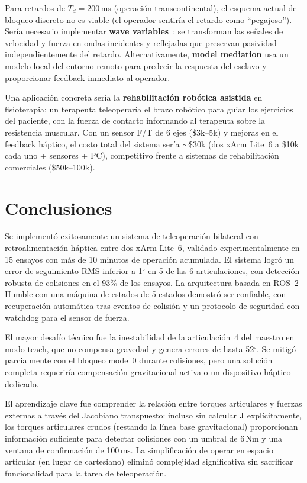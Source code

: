 \documentclass[journal,10pt,twoside]{IEEEtran}
\begin{document}
Para retardos de $T_d=200$\,ms (operación
transcontinental), el esquema actual de bloqueo discreto no es viable
(el operador sentiría el retardo como ``pegajoso''). Sería necesario
implementar \textbf{wave variables}~\cite{niemeyer2008}: se
transforman las señales de velocidad y fuerza en ondas incidentes y
reflejadas que preservan pasividad independientemente del retardo.
Alternativamente, \textbf{model mediation} usa un modelo local del
entorno remoto para predecir la respuesta del esclavo y proporcionar
feedback inmediato al operador.

Una aplicación concreta sería la \textbf{rehabilitación
robótica asistida} en fisioterapia: un terapeuta teleoperaría el brazo
robótico para guiar los ejercicios del paciente, con la fuerza de
contacto informando al terapeuta sobre la resistencia muscular.
Con un sensor F/T de 6 ejes (\$3k--5k) y mejoras en el feedback
háptico, el costo total del sistema sería $\sim$\$30k (dos xArm
Lite~6 a \$10k cada uno + sensores + PC), competitivo frente a
sistemas de rehabilitación comerciales (\$50k--100k).

\section{Conclusiones}
\label{sec:conclusions}

Se implementó exitosamente un sistema de teleoperación bilateral con
retroalimentación háptica entre dos xArm Lite~6, validado
experimentalmente en 15 ensayos con más de 10 minutos de operación
acumulada. El sistema logró un error de seguimiento RMS inferior a
1$^\circ$ en 5 de las 6 articulaciones, con detección robusta de
colisiones en el 93\% de los ensayos. La arquitectura basada en ROS~2
Humble con una máquina de estados de 5 estados demostró ser confiable,
con recuperación automática tras eventos de colisión y un protocolo
de seguridad con watchdog para el sensor de fuerza.

El mayor desafío técnico fue la inestabilidad de la articulación~4 del
maestro en modo teach, que no compensa gravedad y genera errores de
hasta 52$^\circ$. Se mitigó parcialmente con el bloqueo mode~0 durante
colisiones, pero una solución completa requeriría compensación
gravitacional activa o un dispositivo háptico dedicado.

El aprendizaje clave fue comprender la relación entre torques articulares
y fuerzas externas a través del Jacobiano transpuesto: incluso sin
calcular $\bm{J}$ explícitamente, los torques articulares crudos
(restando la línea base gravitacional) proporcionan información
suficiente para detectar colisiones con un umbral de 6\,Nm y una
ventana de confirmación de 100\,ms. La simplificación de operar
en espacio articular (en lugar de cartesiano) eliminó complejidad
significativa sin sacrificar funcionalidad para la tarea de teleoperación.
\end{document}
